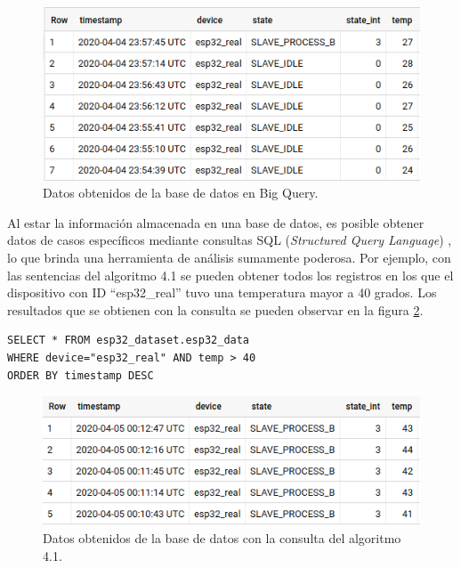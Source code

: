 \begin{figure}[h]
\centering
\includegraphics[width=\textwidth]{./Figures/gcloud_big_query.png}
\caption{Datos obtenidos de la base de datos en Big Query.}
\label{fig:gcloud_big_query}
\end{figure}

Al estar la información almacenada en una base de datos, es posible obtener datos de casos específicos mediante consultas SQL (\emph{Structured Query Language}) \citep{sql}, lo que brinda una herramienta de análisis sumamente poderosa. Por ejemplo, con las sentencias del algoritmo 4.1 se pueden obtener todos los registros en los que el dispositivo con ID \enquote{esp32\_real} tuvo una temperatura mayor a 40 grados. Los resultados que se obtienen con la consulta se pueden observar en la figura \ref{fig:gcloud_big_query_filter}.


\begin{lstlisting}[label=sql_query:vControl,caption=Consulta SQL para obtener información de la base de datos en Big Query.]
SELECT * FROM esp32_dataset.esp32_data
WHERE device="esp32_real" AND temp > 40
ORDER BY timestamp DESC
\end{lstlisting}

\begin{figure}[h]
\centering
\includegraphics[width=\textwidth]{./Figures/gcloud_big_query_filter.png}
\caption{Datos obtenidos de la base de datos con la consulta del algoritmo 4.1.}
\label{fig:gcloud_big_query_filter}
\end{figure}

